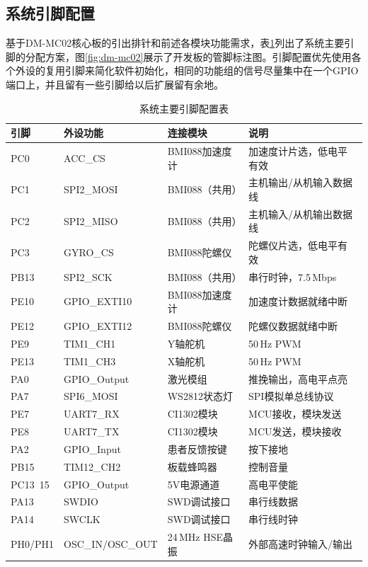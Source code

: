 \subsection{系统引脚配置}

基于DM-MC02核心板的引出排针和前述各模块功能需求，表\ref{tab:pinout}列出了系统主要引脚的分配方案，图\ref{fig:dm-mc02}展示了开发板的管脚标注图。引脚配置优先使用各个外设的复用引脚来简化软件初始化，相同的功能组的信号尽量集中在一个GPIO端口上，并且留有一些引脚给以后扩展留有余地。

\begin{table}[h!]
\centering
\caption{系统主要引脚配置表}
\label{tab:pinout}
\begin{tabular}{p{2.2cm} p{4cm} p{2.8cm} p{4cm}}
\toprule[1.5pt]
\textbf{引脚} & \textbf{外设功能} & \textbf{连接模块} & \textbf{说明} \\
\midrule[0.75pt]
PC0    & ACC\_CS                & BMI088加速度计 & 加速度计片选，低电平有效 \\
PC1    & SPI2\_MOSI             & BMI088（共用）  & 主机输出/从机输入数据线 \\
PC2    & SPI2\_MISO             & BMI088（共用）  & 主机输入/从机输出数据线 \\
PC3    & GYRO\_CS               & BMI088陀螺仪   & 陀螺仪片选，低电平有效 \\
PB13   & SPI2\_SCK              & BMI088（共用）  & 串行时钟，7.5\,Mbps \\
PE10   & GPIO\_EXTI10           & BMI088加速度计 & 加速度计数据就绪中断 \\
PE12   & GPIO\_EXTI12           & BMI088陀螺仪   & 陀螺仪数据就绪中断 \\
PE9    & TIM1\_CH1              & Y轴舵机 & 50\,Hz PWM \\
PE13   & TIM1\_CH3              & X轴舵机 & 50\,Hz PWM \\
PA0    & GPIO\_Output           & 激光模组        & 推挽输出，高电平点亮 \\
PA7    & SPI6\_MOSI             & WS2812状态灯    & SPI模拟单总线协议 \\
PE7    & UART7\_RX              & CI1302模块      & MCU接收，模块发送\\
PE8    & UART7\_TX              & CI1302模块      & MCU发送，模块接收\\
PA2    & GPIO\_Input    & 患者反馈按键    & 按下接地 \\
PB15   & TIM12\_CH2             & 板载蜂鸣器      & 控制音量 \\
PC13~15   & GPIO\_Output           & 5V电源通道     & 高电平使能 \\
PA13   & SWDIO                  & SWD调试接口     & 串行线数据 \\
PA14   & SWCLK                  & SWD调试接口     & 串行线时钟 \\
PH0/PH1 & OSC\_IN/OSC\_OUT       & 24\,MHz HSE晶振 & 外部高速时钟输入/输出 \\
\bottomrule[0.75pt]
\end{tabular}
\end{table}

